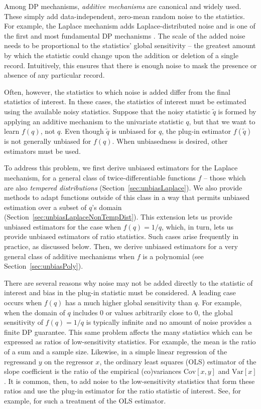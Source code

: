 \documentclass[11pt]{article}
\begin{document}
Among DP mechanisms, \textit{additive mechanisms} are canonical and widely used. These simply add data-independent, zero-mean random noise to the statistics. For example, the Laplace mechanism adds Laplace-distributed noise and is one of the first and most fundamental DP mechanisms \cite{Dwork_McSherry_Nissim_Smith_2017}. The scale of the added noise needs to be proportional to the statistics' global sensitivity -- the greatest amount by which the statistic could change upon the addition or deletion of a single record. Intuitively, this ensures that there is enough noise to mask the presence or absence of any particular record.

Often, however, the statistics to which noise is added differ from the final statistics of interest. In these cases, the statistics of interest must be estimated using the available noisy statistics. Suppose that the noisy statistic $\tilde{q}$ is formed by applying an additive mechanism to the univariate statistic $q$, but that we want to learn $f(q)$, not $q$. Even though $\tilde{q}$ is unbiased for $q$, the plug-in estimator $f(\tilde{q})$ is not generally unbiased for $f(q)$. When unbiasedness is desired, other estimators must be used.

To address this problem, we first derive unbiased estimators for the Laplace mechanism, for a general class of twice-differentiable functions $f$ -- those which are also \textit{tempered distributions} (Section~\ref{sec:unbiasLaplace}). We also provide methods to adapt functions outside of this class in a way that permits unbiased estimation over a subset of $q$'s domain (Section~\ref{sec:unbiasLaplaceNonTempDist}). This extension lets us provide unbiased estimators for the case when $f(q) = 1/q$, which, in turn, lets us provide unbiased estimators of ratio statistics. Such cases arise frequently in practice, as discussed below. Then, we derive unbiased estimators for a very general class of additive mechanisms when $f$ is a polynomial (see Section~\ref{sec:unbiasPoly}).

There are several reasons why noise may not be added directly to the statistic of interest and bias in the plug-in statistic must be considered. A leading case occurs when $f(q)$ has a much higher global sensitivity than $q$. For example, when the domain of $q$ includes 0 or values arbitrarily close to 0, the global sensitivity of $f(q) = 1/q$ is typically infinite and no amount of noise provides a finite DP guarantee. This same problem affects the many statistics which can be expressed as ratios of low-sensitivity statistics. For example, the mean is the ratio of a sum and a sample size. Likewise, in a simple linear regression of the regressand $y$ on the regressor $x$, the ordinary least squares (OLS) estimator of the slope coefficient is the ratio of the empirical (co)variances $\text{Cov}[x,y]$ and $\text{Var}[x]$. It is common, then, to add noise to the low-sensitivity statistics that form these ratios and use the plug-in estimator for the ratio statistic of interest. See, for example, \cite{alabi2020differentially} for such a treatment of the OLS estimator.
\end{document}
